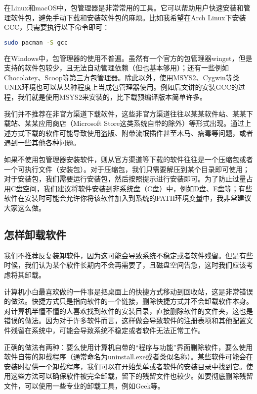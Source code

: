\documentclass[../main.tex]{subfiles}
\begin{document}
在Linux和macOS中，包管理器是非常常用的工具。它可以帮助用户快速安装和管理软件包，避免手动下载和安装软件包的麻烦。比如我希望在Arch Linux下安装GCC，只需要执行以下命令即可：

\begin{lstlisting}[language=bash]
    sudo pacman -S gcc
\end{lstlisting}

在Windows中，包管理器的使用不普遍。虽然有一个官方的包管理器winget，但是支持的软件包较少，且无法自动管理依赖（但也基本够用）；还有一些例如Chocolatey、Scoop等第三方包管理器。除此以外，使用MSYS2、Cygwin等类UNIX环境也可以从某种程度上当成包管理器使用。例如后文讲的安装GCC的过程，我们就是使用MSYS2来安装的，比下载预编译版本简单许多。

我们并不推荐在非官方渠道下载软件，这些非官方渠道往往以某某软件站、某某下载站、某某应用商店（Microsoft Store这类系统自带的除外）等形式出现。通过上述方式下载的软件可能导致使用盗版、附带流氓插件甚至木马、病毒等问题，或者遇到一些其他各种问题。

如果不使用包管理器安装软件，则从官方渠道等下载的软件往往是一个压缩包或者一个可执行文件（安装包）。对于压缩包，我们只需要解压到某个目录即可使用；对于安装包，我们需要运行安装包，然后按照提示进行安装即可。为了防止过量占用C盘空间，我们建议将软件安装到非系统盘（C盘）中，例如D盘、E盘等；有些软件在安装时可能会允许你将该软件加入到系统的PATH环境变量中，我非常建议大家这么做。

\subsection{怎样卸载软件}

我们不推荐反复装卸软件，因为这可能会导致系统不稳定或者软件残留。但是有些时候，我们认为某个软件长期内不会再需要了，且磁盘空间告急，这时我们应该考虑将其卸载。

计算机小白最喜欢做的一件事是把桌面上的快捷方式移动到回收站，这是非常错误的做法。快捷方式只是指向软件的一个链接，删除快捷方式并不会卸载软件本身。对计算机半懂不懂的人喜欢找到软件的安装目录，直接删除软件的文件夹，这也是错误的做法。因为对于许多软件而言，这样做会导致软件的注册表项和其他配置文件残留在系统中，可能会导致系统不稳定或者软件无法正常工作。

正确的做法有两种：要么使用计算机自带的“程序与功能”界面删除软件，要么使用软件自带的卸载程序（通常命名为uninstall.exe或者类似名称）。某些软件可能会在安装时提供一个卸载程序，我们可以在开始菜单或者软件的安装目录中找到它。使用这些方法可以确保软件被完全卸载，留下的残留文件也较少。如要彻底删除残留文件，可以使用一些专业的卸载工具，例如Geek等。
\end{document}

